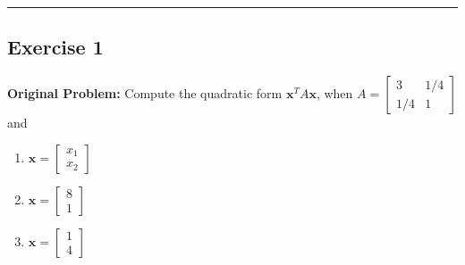 \documentclass[11pt, letterpaper]{article}
\theoremstyle{definition}
\theoremstyle{remark}
\begin{document}
\medskip\hrule\medskip

\subsection*{Exercise 1}
\textbf{Original Problem:} Compute the quadratic form $\mathbf{x}^T A \mathbf{x}$, when $A = \begin{bmatrix} 3 & 1/4 \\ 1/4 & 1 \end{bmatrix}$ and
\begin{enumerate}[label=\alph*.]
    \item $\mathbf{x} = \begin{bmatrix} x_1 \\ x_2 \end{bmatrix}$
    \item $\mathbf{x} = \begin{bmatrix} 8 \\ 1 \end{bmatrix}$
    \item $\mathbf{x} = \begin{bmatrix} 1 \\ 4 \end{bmatrix}$
\end{enumerate}
\end{document}
